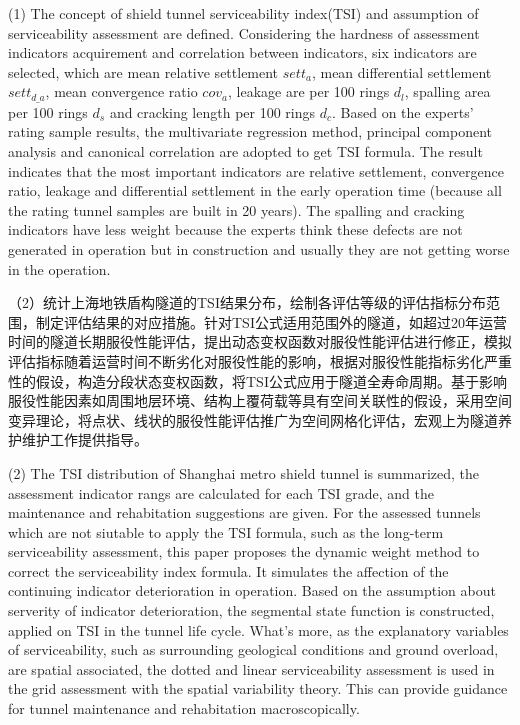 \begin{cabstract}
(1) The concept of shield tunnel serviceability index(TSI) and assumption of serviceability assessment are defined. Considering the hardness of assessment indicators acquirement and correlation between indicators, six indicators are selected, which are mean relative settlement $sett_{a}$, mean differential settlement $sett_{d\_a}$, mean convergence ratio $cov_a$, leakage are per 100 rings $d_l$, spalling area per 100 rings $d_s$ and cracking length per 100 rings $d_c$. Based on the experts' rating sample results, the multivariate regression method, principal component analysis and canonical correlation are adopted to get TSI formula. The result indicates that the most important indicators are relative settlement, convergence ratio, leakage and differential settlement in the early operation time (because all the rating tunnel samples are built in 20 years). The spalling and cracking indicators have less weight because the experts think these defects are not generated in operation but in construction and usually they are not getting worse in the operation. 

（2）统计上海地铁盾构隧道的TSI结果分布，绘制各评估等级的评估指标分布范围，制定评估结果的对应措施。针对TSI公式适用范围外的隧道，如超过20年运营时间的隧道长期服役性能评估，提出动态变权函数对服役性能评估进行修正，模拟评估指标随着运营时间不断劣化对服役性能的影响，根据对服役性能指标劣化严重性的假设，构造分段状态变权函数，将TSI公式应用于隧道全寿命周期。基于影响服役性能因素如周围地层环境、结构上覆荷载等具有空间关联性的假设，采用空间变异理论，将点状、线状的服役性能评估推广为空间网格化评估，宏观上为隧道养护维护工作提供指导。

(2) The TSI distribution of Shanghai metro shield tunnel is summarized, the assessment indicator rangs are calculated for each TSI grade, and the maintenance and rehabitation suggestions are given. For the assessed tunnels which are not siutable to apply the TSI formula, such as the long-term serviceability assessment, this paper proposes the dynamic weight method to correct the serviceability index formula. It simulates the affection of the continuing indicator deterioration in operation. Based on the assumption about serverity of indicator deterioration, the segmental state function is constructed, applied on TSI in the tunnel life cycle. What's more, as the explanatory variables of serviceability, such as surrounding geological conditions and ground overload, are spatial associated, the dotted and linear serviceability assessment is used in the grid assessment with the spatial variability theory. This can provide guidance for tunnel maintenance and rehabitation macroscopically.


\end{cabstract}
